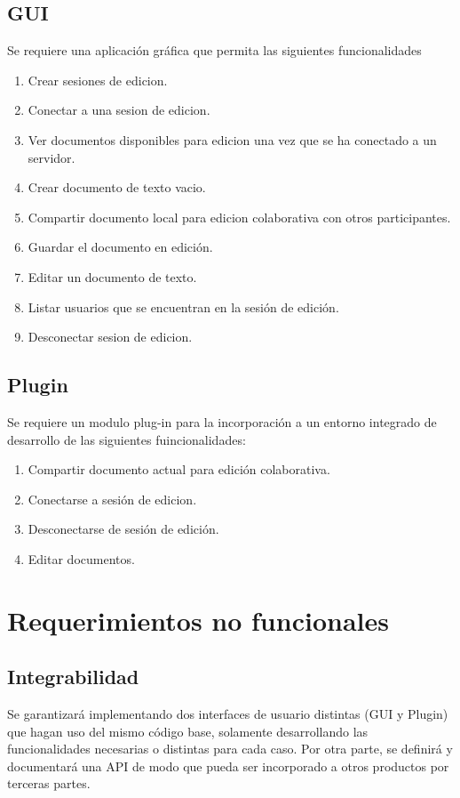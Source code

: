 \documentclass[12pt,a4paper]{article}
\begin{document}
	\subsection{GUI} 
	Se requiere una aplicación gráfica que permita las siguientes funcionalidades
	\begin{enumerate}
	\item Crear sesiones de edicion.
	\item Conectar a una sesion de edicion.
	\item Ver documentos disponibles para edicion una vez que se ha conectado a un servidor.
	\item Crear documento de texto vacio.
	\item Compartir documento local para edicion colaborativa con otros participantes.
	\item Guardar el documento en edición.
	\item Editar un documento de texto.
	\item Listar usuarios que se encuentran en la sesión de edición.
	\item Desconectar sesion de edicion.
	\end{enumerate}


\subsection{Plugin}
Se requiere un modulo plug-in para la incorporación a un entorno integrado de desarrollo de las siguientes fuincionalidades:
	\begin{enumerate}
	\item Compartir documento actual para edición colaborativa.
	\item Conectarse a sesión de edicion.
	\item Desconectarse de sesión de edición.
	\item Editar documentos.
	\end{enumerate}
	\section{Requerimientos no funcionales}


\subsection{Integrabilidad} Se garantizará implementando dos interfaces de usuario distintas (GUI y Plugin) que hagan uso del mismo código base, solamente desarrollando las funcionalidades necesarias o distintas para cada caso.
Por otra parte, se definirá y documentará una API de modo que pueda ser incorporado a otros productos por terceras partes.
\end{document}
